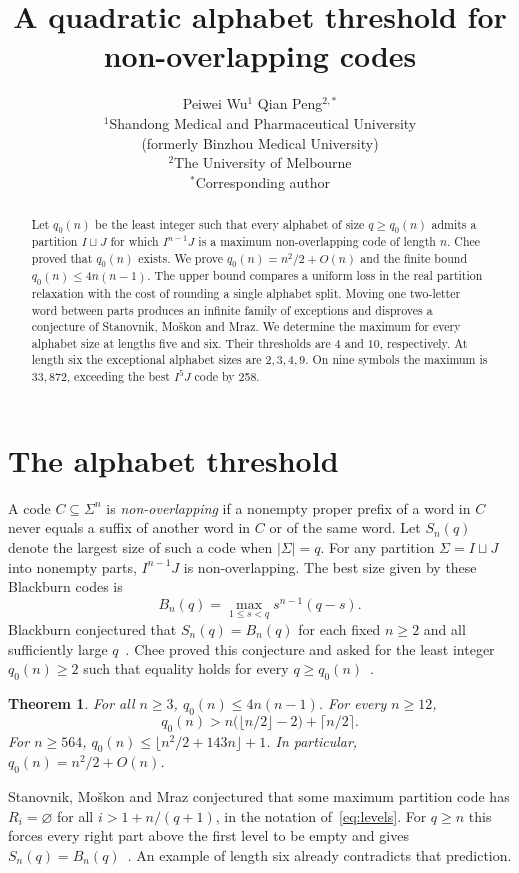 \documentclass[11pt,a4paper]{article}
\title{A quadratic alphabet threshold for non-overlapping codes}
\author{Peiwei Wu$^{1}$ \qquad Qian Peng$^{2,*}$\\[0.5ex]
\small $^{1}$Shandong Medical and Pharmaceutical University\\
\small (formerly Binzhou Medical University)\\
\small $^{2}$The University of Melbourne\\
\small $^{*}$Corresponding author}
\date{}
\newtheorem{theorem}{Theorem}
\newcommand{\floor}[1]{\lfloor #1\rfloor}
\newcommand{\ceil}[1]{\lceil #1\rceil}
\begin{document}
\maketitle
\begin{abstract}
Let $q_0(n)$ be the least integer such that every alphabet of size $q\ge q_0(n)$ admits a partition $I\sqcup J$ for which $I^{n-1}J$ is a maximum non-overlapping code of length $n$. Chee proved that $q_0(n)$ exists. We prove $q_0(n)=n^2/2+O(n)$ and the finite bound $q_0(n)\le4n(n-1)$. The upper bound compares a uniform loss in the real partition relaxation with the cost of rounding a single alphabet split. Moving one two-letter word between parts produces an infinite family of exceptions and disproves a conjecture of Stanovnik, Mo\v{s}kon and Mraz. We determine the maximum for every alphabet size at lengths five and six. Their thresholds are $4$ and $10$, respectively. At length six the exceptional alphabet sizes are $2,3,4,9$. On nine symbols the maximum is $33{,}872$, exceeding the best $I^5J$ code by 258.
\end{abstract}

\section{The alphabet threshold}

A code $C\subseteq\Sigma^n$ is \emph{non-overlapping} if a nonempty proper prefix of a word in $C$ never equals a suffix of another word in $C$ or of the same word. Let $S_n(q)$ denote the largest size of such a code when $|\Sigma|=q$. For any partition $\Sigma=I\sqcup J$ into nonempty parts, $I^{n-1}J$ is non-overlapping. The best size given by these Blackburn codes is
\[
 B_n(q)=\max_{1\le s<q}s^{n-1}(q-s).
\]
Blackburn conjectured that $S_n(q)=B_n(q)$ for each fixed $n\ge2$ and all sufficiently large $q$~\cite{Blackburn}. Chee proved this conjecture and asked for the least integer $q_0(n)\ge2$ such that equality holds for every $q\ge q_0(n)$~\cite[Theorem~I.1 and Section~IV]{Chee}.

\begin{theorem}\label{th:threshold}
For all $n\ge3$, $q_0(n)\le 4n(n-1)$. For every $n\ge12$,
\[
 q_0(n)>n\bigl(\floor{n/2}-2\bigr)+\ceil{n/2}.
\]
For $n\ge564$, $q_0(n)\le\floor{n^2/2+143n}+1$. In particular, $q_0(n)=n^2/2+O(n)$.
\end{theorem}

Stanovnik, Mo\v{s}kon and Mraz conjectured that some maximum partition code has $R_i=\varnothing$ for all $i>1+n/(q+1)$, in the notation of~\eqref{eq:levels}. For $q\ge n$ this forces every right part above the first level to be empty and gives $S_n(q)=B_n(q)$~\cite[Conjecture~1 and Remark~3]{SMM}. An example of length six already contradicts that prediction.
\end{document}
